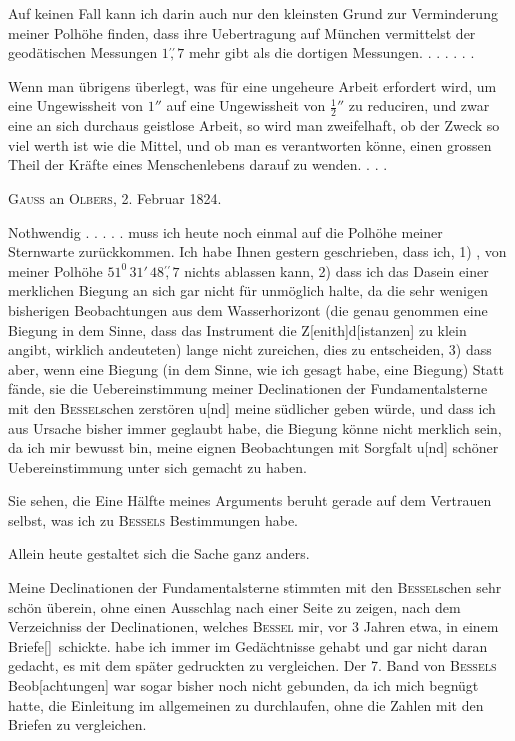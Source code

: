 Auf keinen Fall kann ich darin auch nur den kleinsten Grund zur Verminderung meiner Polhöhe finden, dass ihre Uebertragung auf München vermittelst der geodätischen Messungen \(1\overset{\prime\prime}{,}7\) mehr gibt als die dortigen Messungen. . . . . . .

Wenn man übrigens überlegt, was für eine ungeheure Arbeit erfordert wird, um eine Ungewissheit von \(1''\) auf eine Ungewissheit von \(\tfrac{1}{2}''\) zu reduciren, und zwar eine an sich durchaus geistlose Arbeit, so wird man zweifelhaft, ob der Zweck so viel werth ist wie die Mittel, und ob man es verantworten könne, einen grossen Theil der Kräfte eines Menschenlebens darauf zu wenden. . . .

\begin{center}\textsc{Gauss} an \textsc{Olbers}, 2. Februar 1824.\end{center}
\noindent\hspace*{\parindent}Nothwendig . . . . . muss ich heute noch einmal auf die Polhöhe meiner Sternwarte zurückkommen.
\clearpage{}
Ich habe Ihnen gestern geschrieben, dass ich, 1) , von meiner Polhöhe \(51^0\,31'\,48\overset{\prime\prime}{,}7\) nichts ablassen kann, 2) dass ich das Dasein einer merklichen Biegung an sich gar nicht für unmöglich halte, da die sehr wenigen bisherigen Beobachtungen aus dem Wasserhorizont (die genau genommen eine  Biegung in dem Sinne, dass das Instrument die Z[enith]d[istanzen] zu klein angibt, wirklich andeuteten) lange nicht zureichen, dies zu entscheiden, 3) dass aber, wenn eine Biegung (in dem Sinne, wie ich gesagt habe, eine  Biegung) Statt fände, sie die Uebereinstimmung meiner Declinationen der Fundamentalsterne mit den \textsc{Bessel}schen zerstören u[nd] meine südlicher geben würde, und dass ich aus  Ursache bisher immer geglaubt habe, die Biegung könne nicht merklich sein, da ich mir bewusst bin, meine eignen Beobachtungen mit Sorgfalt u[nd] schöner Uebereinstimmung unter sich gemacht zu haben.

Sie sehen, die Eine Hälfte meines Arguments beruht gerade auf dem Vertrauen selbst, was ich zu \textsc{Bessels} Bestimmungen habe.

Allein heute gestaltet sich die Sache ganz anders.

Meine Declinationen der Fundamentalsterne stimmten mit den \textsc{Bessel}schen sehr schön überein, ohne einen Ausschlag nach einer Seite zu zeigen, nach dem Verzeichniss der Declinationen, welches \textsc{Bessel} mir, vor 3 Jahren etwa, in einem Briefe[\begingroup\renewcommand{\thefootnote}{*)}\footnotemark\renewcommand{\thefootnote}{[*)}\footnotetext{In dem Briefe vom 19. April 1821, S. 333.]}\endgroup]\ schickte.  habe ich immer im Gedächtnisse gehabt und gar nicht daran gedacht, es mit dem später gedruckten zu vergleichen. Der 7. Band von \textsc{Bessels} Beob[achtungen] war sogar bisher noch nicht gebunden, da ich mich begnügt hatte, die Einleitung im allgemeinen zu durchlaufen, ohne die Zahlen mit den Briefen zu vergleichen.

